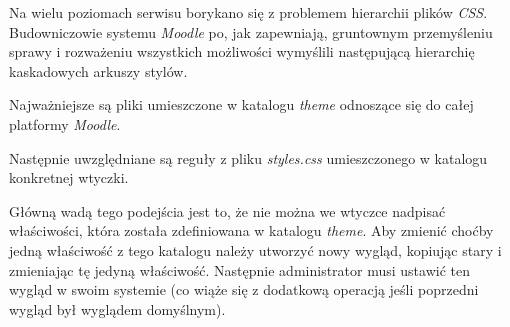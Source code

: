 Na wielu poziomach serwisu borykano się z problemem hierarchii plików \emph{CSS}. Budowniczowie systemu \emph{Moodle} po, jak zapewniają, gruntownym przemyśleniu sprawy i rozważeniu wszystkich możliwości wymyślili następującą hierarchię kaskadowych arkuszy stylów.
\begin{description}
\item Najważniejsze są pliki umieszczone w katalogu \emph{theme} odnoszące się do całej platformy \emph{Moodle}.
\item Następnie uwzględniane są reguły z pliku \emph{styles.css} umieszczonego w katalogu konkretnej wtyczki.
\end{description}
Główną wadą tego podejścia jest to, że nie można we wtyczce nadpisać właściwości, która została zdefiniowana w katalogu \emph{theme}. Aby zmienić choćby jedną właściwość z tego katalogu należy utworzyć nowy wygląd, kopiując stary i zmieniając tę jedyną właściwość. Następnie administrator musi ustawić ten wygląd w swoim systemie (co wiąże się z dodatkową operacją jeśli poprzedni wygląd był wyglądem domyślnym).